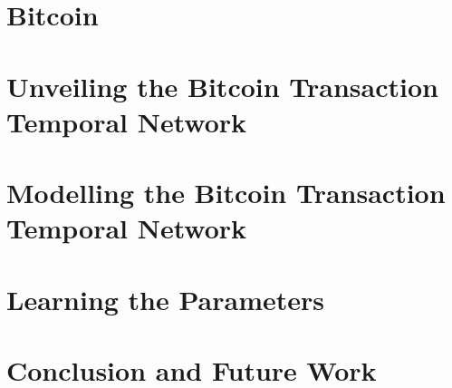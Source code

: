 \documentclass[12pt, %
abstract=on %
]{scrreprt} %
\theoremstyle{definition}
\theoremstyle{remark}
\begin{document}
    \newpage
    
%    
    
    \chapter{Bitcoin}
    \label{chap:Bitcoin}
    

    
    \chapter{Unveiling the Bitcoin Transaction Temporal Network}
    \label{chap:unveiling}
    
    
    
    
    
    \chapter{Modelling the Bitcoin Transaction Temporal Network}
    \label{chap:modelling}
    
    
    


    \chapter{Learning the Parameters}
    \label{chap:learning}
    
    
        
    \chapter{Conclusion and Future Work}
    
    
       

    \FloatBarrier

    \printbibliography
  
\end{document}
